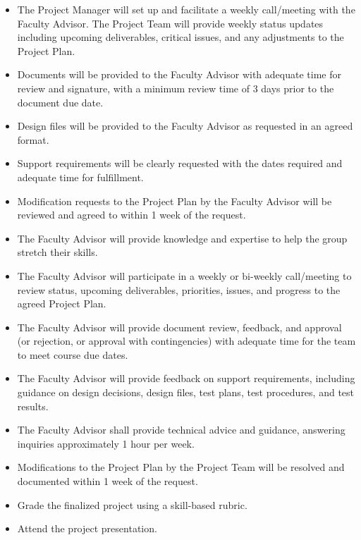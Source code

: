 \preparedby


\begin{itemize}[leftmargin=1.4em]
  \item The Project Manager will set up and facilitate a weekly call/meeting with the Faculty Advisor. The Project Team will provide weekly status updates including upcoming deliverables, critical issues, and any adjustments to the Project Plan.
  \item Documents will be provided to the Faculty Advisor with adequate time for review and signature, with a minimum review time of 3 days prior to the document due date.
  \item Design files will be provided to the Faculty Advisor as requested in an agreed format.
  \item Support requirements will be clearly requested with the dates required and adequate time for fulfillment.
  \item Modification requests to the Project Plan by the Faculty Advisor will be reviewed and agreed to within 1 week of the request.
\end{itemize}

\begin{itemize}[leftmargin=1.4em]
  \item The Faculty Advisor will provide knowledge and expertise to help the group stretch their skills.
  \item The Faculty Advisor will participate in a weekly or bi-weekly call/meeting to review status, upcoming deliverables, priorities, issues, and progress to the agreed Project Plan.
  \item The Faculty Advisor will provide document review, feedback, and approval (or rejection, or approval with contingencies) with adequate time for the team to meet course due dates.
  \item The Faculty Advisor will provide feedback on support requirements, including guidance on design decisions, design files, test plans, test procedures, and test results.
  \item The Faculty Advisor shall provide technical advice and guidance, answering inquiries approximately 1 hour per week.
  \item Modifications to the Project Plan by the Project Team will be resolved and documented within 1 week of the request.
  \item Grade the finalized project using a skill-based rubric.
  \item Attend the project presentation.
\end{itemize}


